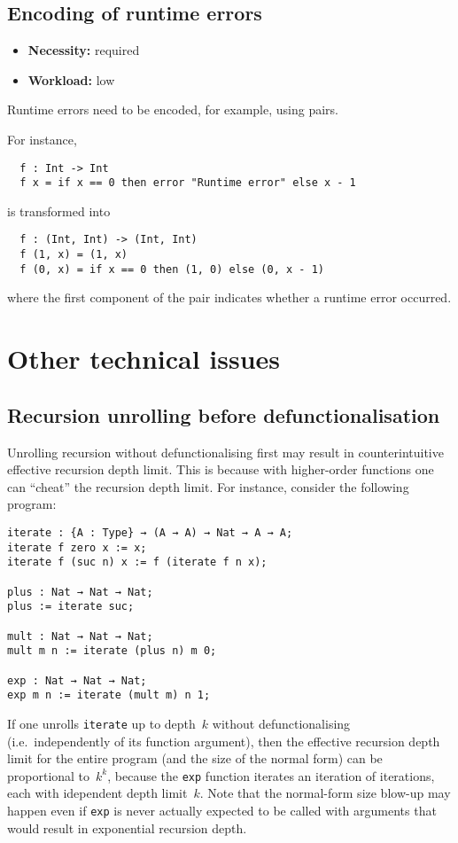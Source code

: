\documentclass[
    9pt,            %
    techreport,        %
    affiltop,       %
]{art}
\begin{document}
\subsection{Encoding of runtime errors}\label{sec_errors}

\begin{itemize}
\item {\bf Necessity:} required
\item {\bf Workload:} low
\end{itemize}

\noindent Runtime errors need to be encoded, for example, using pairs.

\medskip

\noindent For instance,
\begin{verbatim}
  f : Int -> Int
  f x = if x == 0 then error "Runtime error" else x - 1
\end{verbatim}
is transformed into
\begin{verbatim}
  f : (Int, Int) -> (Int, Int)
  f (1, x) = (1, x)
  f (0, x) = if x == 0 then (1, 0) else (0, x - 1)
\end{verbatim}
where the first component of the pair indicates whether a runtime
error occurred.

\section{Other technical issues}\label{sec_issues}

\subsection{Recursion unrolling before defunctionalisation}

Unrolling recursion without defunctionalising first may result in
counterintuitive effective recursion depth limit. This is because with
higher-order functions one can ``cheat'' the recursion depth
limit. For instance, consider the following \Juvix{} program:
\begin{verbatim}
iterate : {A : Type} → (A → A) → Nat → A → A;
iterate f zero x := x;
iterate f (suc n) x := f (iterate f n x);

plus : Nat → Nat → Nat;
plus := iterate suc;

mult : Nat → Nat → Nat;
mult m n := iterate (plus n) m 0;

exp : Nat → Nat → Nat;
exp m n := iterate (mult m) n 1;
\end{verbatim}
If one unrolls \texttt{iterate} up to depth~$k$ without
defunctionalising (i.e.~independently of its function argument), then
the effective recursion depth limit for the entire program (and the
size of the normal form) can be proportional to~$k^k$, because the
\texttt{exp} function iterates an iteration of iterations, each with
idependent depth limit~$k$. Note that the normal-form size blow-up may
happen even if \texttt{exp} is never actually expected to be called
with arguments that would result in exponential recursion depth.
\end{document}
